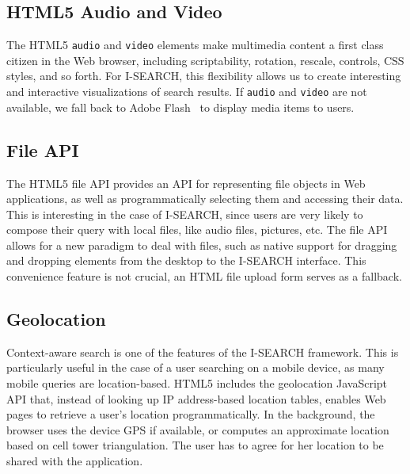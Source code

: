 \documentclass[runningheads,a4paper]{llncs} \usepackage[utf8]{inputenc}
\begin{document}
\subsection{HTML5 Audio and Video}
The HTML5 \texttt{audio} and \texttt{video} elements make multimedia content a first class citizen in the Web browser, including scriptability, rotation, rescale, controls, CSS styles, and so forth. For \mbox{I-SEARCH}, this flexibility allows us to create interesting and interactive visualizations of search results. If \texttt{audio} and \texttt{video} are not available, we fall back to Adobe Flash~\cite{flash} to display media items to users.

\subsection{File API}
The HTML5 file API provides an API for representing file objects in Web applications, as well as programmatically selecting them and accessing their data. This is interesting in the case of \mbox{I-SEARCH}, since users are very likely to compose their query with local files, like audio files, pictures, etc. The file API allows for a new paradigm to deal with files, such as native support for dragging and dropping elements from the desktop to the \mbox{I-SEARCH} interface. This convenience feature is not crucial, an HTML file upload form serves as a fallback.

\subsection{Geolocation}
Context-aware search is one of the features of the \mbox{I-SEARCH} framework. This is particularly useful in the case of a user searching on a mobile device, as many mobile queries are location-based. HTML5 includes the geolocation JavaScript API that, instead of looking up IP address-based location tables, enables Web pages to retrieve a user's
location programmatically. In the background, the browser uses the device GPS if available, or computes an approximate location based on cell tower triangulation. The user has to agree for her location to be shared with the application.
\end{document}
